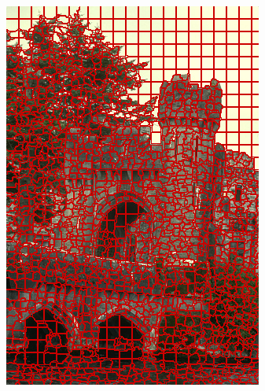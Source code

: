 \begin{figure}
{		\includegraphics[scale=\scalefivebsdtest]{pictures/bsd-test-5-pb}
	}
	\subfigure{
}
\end{figure}
